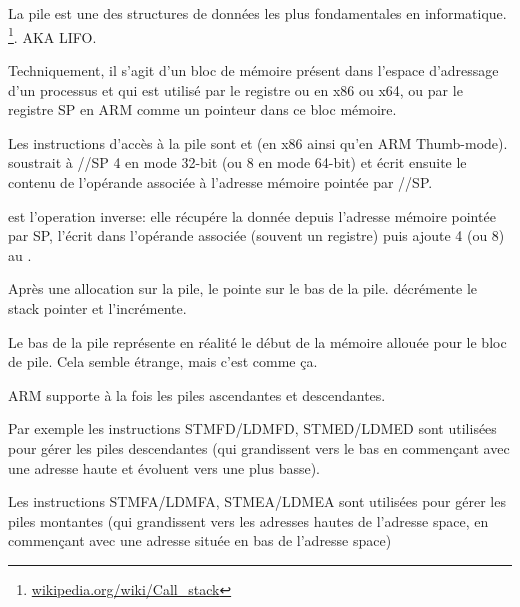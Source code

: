 \section{\Stack}
\label{sec:stack}
\myindex{\Stack}

La pile est une des structures de données les plus fondamentales en informatique.
\footnote{\href{http://go.yurichev.com/17119}{wikipedia.org/wiki/Call\_stack}}.
\ac{AKA} \ac{LIFO}.

Techniquement, il s'agit d'un bloc de mémoire présent dans l'espace d'adressage
d'un processus et qui est utilisé par le registre \ESP ou \RSP en x86 ou x64,
ou par le registre \ac{SP} en ARM comme un pointeur dans ce bloc mémoire. 

Les instructions d'accès à la pile sont \PUSH et \POP (en x86 ainsi qu'en ARM Thumb-mode).
\PUSH soustrait à \ESP/\RSP/\ac{SP} 4 en mode 32-bit (ou 8 en mode 64-bit) et écrit
ensuite le contenu de l'opérande associée à l'adresse mémoire pointée par \ESP/\RSP/\ac{SP}.

\POP est l'operation inverse: elle récupére la donnée depuis l'adresse mémoire pointée par \ac{SP},
l'écrit dans l'opérande associée (souvent un registre) puis ajoute 4 (ou 8) au .

Après une allocation sur la pile, le  pointe sur le bas de la pile.
\PUSH décrémente le \gls{stack pointer} et \POP l'incrémente.

Le bas de la pile représente en réalité le début de la mémoire allouée pour
 le bloc de pile. Cela semble étrange, mais c'est comme ça.

ARM supporte à la fois les piles ascendantes et descendantes.


Par exemple les instructions \ac{STMFD}/\ac{LDMFD}, \ac{STMED}/\ac{LDMED} sont utilisées pour gérer les piles
descendantes (qui grandissent vers le bas en commençant avec une adresse haute et évoluent vers une plus basse).

Les instructions \ac{STMFA}/\ac{LDMFA}, \ac{STMEA}/\ac{LDMEA} sont utilisées pour gérer les piles montantes
(qui grandissent vers les adresses hautes de l'adresse space, en commençant avec une adresse située en bas de l'adresse space)

